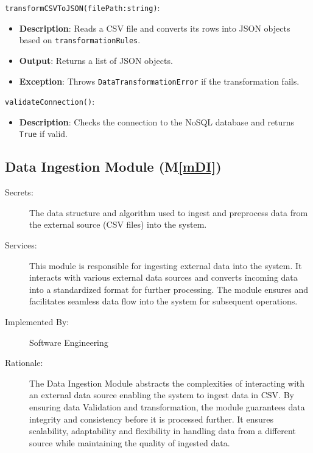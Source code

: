 \documentclass[12pt, titlepage]{article}
\newcommand{\mref}[1]{M\ref{#1}}
\begin{document}
\begin{description}
  \item[Local Function:] 
  \item
\texttt{transformCSVToJSON(filePath:string)}:
  \item
  \begin{itemize}
    \item \textbf{Description}: Reads a CSV file and converts its rows into JSON objects based on
    \texttt{transformationRules}.
  \end{itemize}
  \item 
  \begin{itemize}
    \item \textbf{Output}: Returns a list of JSON objects.
  \end{itemize}
  \item
  \begin{itemize}
    \item \textbf{Exception}: Throws \texttt{DataTransformationError} if the
    transformation fails.
  \end{itemize}
  \item 
  \texttt{validateConnection()}:
  \item 
  \begin{itemize}
    \item \textbf{Description}: Checks the connection to the NoSQL database and returns \texttt{True}
    if valid.
  \end{itemize}
\end{description}

\subsection{Data Ingestion Module (\mref{mDI})} \label{mIngestion}
\begin{description}
  \item[Secrets:] The data structure and algorithm used to ingest and preprocess data from
  the external source (CSV files) into the system.
  \item[Services:] This module is responsible for ingesting external data into the system.
  It interacts with various external data sources and converts incoming data into a 
  standardized format for further processing. The module ensures and facilitates seamless
  data flow into the system for subsequent operations.
  \item[Implemented By:] Software Engineering
  \item[Rationale:] The Data Ingestion Module abstracts the complexities of interacting with
  an external data source enabling the system to ingest data in CSV. By ensuring data Validation
  and transformation, the module guarantees data integrity and consistency before it is processed
  further. It ensures scalability, adaptability and flexibility in handling data from a different
  source while maintaining the quality of ingested data.
\end{description}
\end{document}
